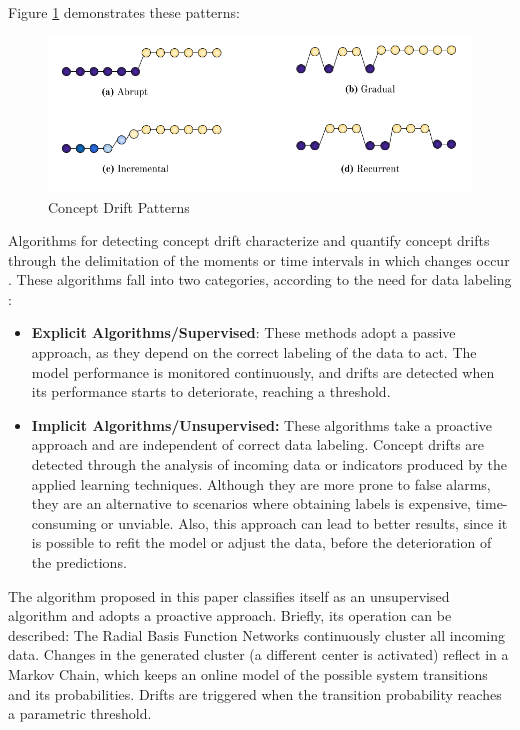 \documentclass[preprint,12pt]{elsarticle}
\begin{document}
Figure \ref{fig:concept_drift_patterns} demonstrates these patterns:

\begin{figure}[h!]
\begin{center}
    \includegraphics[scale=0.65]{img/concept_drift_patterns.png}
    \caption{Concept Drift Patterns}
    \label{fig:concept_drift_patterns}
\end{center}
\end{figure}

Algorithms for detecting concept drift characterize and quantify concept drifts through the delimitation of the moments or time intervals in which changes occur \cite{Basseville:1993:DAC:151741}.
%
These algorithms fall into two categories, according to the need for data labeling \cite{Zliobaite:2010}:

\begin{itemize}
    \item \textbf{Explicit Algorithms/Supervised}: These methods adopt a passive approach, as they depend on the correct labeling of the data to act. The model performance is monitored continuously, and drifts are detected when its performance starts to deteriorate, reaching a threshold.
    \item \textbf{Implicit Algorithms/Unsupervised:} These algorithms take a proactive approach and are independent of correct data labeling. Concept drifts are detected through the analysis of incoming data or indicators produced by the applied learning techniques. Although they are more prone to false alarms, they are an alternative to scenarios where obtaining labels is expensive, time-consuming or unviable. Also, this approach can lead to better results, since it is possible to refit the model or adjust the data, before the deterioration of the predictions.
\end{itemize}

The algorithm proposed in this paper classifies itself as an unsupervised algorithm and adopts a proactive approach.
Briefly, its operation can be described: The Radial Basis Function Networks continuously cluster all incoming data.
Changes in the generated cluster (a different center is activated) reflect in a Markov Chain, which keeps an online model of the possible system transitions and its probabilities. Drifts are triggered when the transition probability reaches a parametric threshold.
\end{document}
